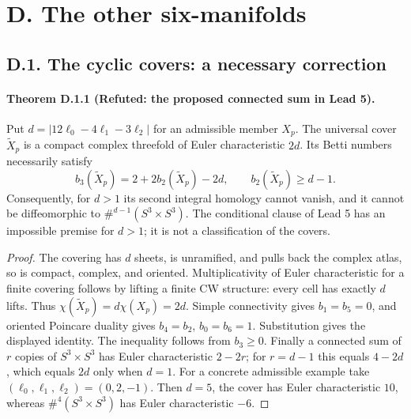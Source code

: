 \section{D. The other six-manifolds}
\subsection{D.1. The cyclic covers: a necessary correction}
\paragraph{Theorem D.1.1 (Refuted: the proposed connected sum in Lead 5).}
Put $d=|12\ell_0-4\ell_1-3\ell_2|$ for an admissible member $X_p$.
The universal cover $\widetilde X_p$ is a compact complex threefold of
Euler characteristic $2d$. Its Betti numbers necessarily satisfy
\[
 b_3(\widetilde X_p)=2+2b_2(\widetilde X_p)-2d,
 \qquad b_2(\widetilde X_p)\geq d-1.
\]
Consequently, for $d>1$ its second integral homology cannot vanish,
and it cannot be diffeomorphic to $\#^{d-1}(S^3\times S^3)$.
The conditional clause of Lead 5 has an impossible premise for $d>1$;
it is not a classification of the covers.
\begin{proof}
The covering has $d$ sheets, is unramified, and pulls back the complex
atlas, so is compact, complex, and oriented. Multiplicativity of Euler
characteristic for a finite covering follows by lifting a finite CW
structure: every cell has exactly $d$ lifts. Thus
$\chi(\widetilde X_p)=d\chi(X_p)=2d$.
Simple connectivity gives $b_1=b_5=0$, and oriented Poincare duality gives
$b_4=b_2$, $b_0=b_6=1$. Substitution gives the displayed identity. The
inequality follows from $b_3\geq0$. Finally a connected sum of $r$
copies of $S^3\times S^3$ has Euler characteristic $2-2r$; for $r=d-1$
this equals $4-2d$, which equals $2d$ only when $d=1$.
For a concrete admissible example take $(\ell_0,\ell_1,\ell_2)=(0,2,-1)$.
Then $d=5$, the cover has Euler characteristic $10$, whereas
$\#^4(S^3\times S^3)$ has Euler characteristic $-6$.
\end{proof}

